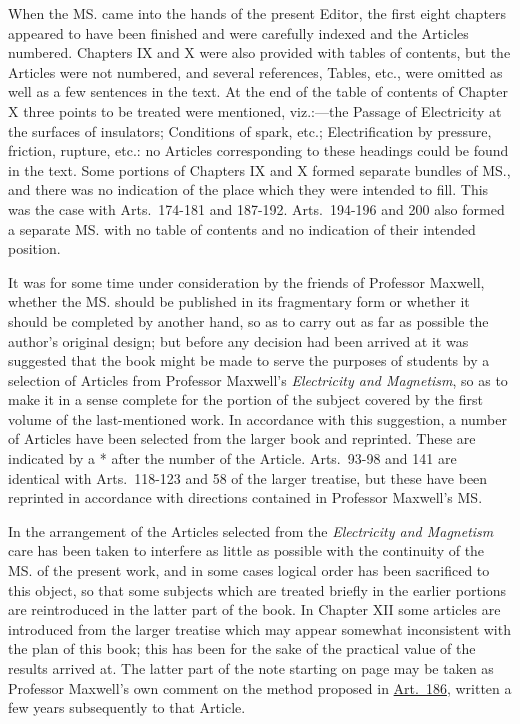 \documentclass[12pt,oneside]{book}[2021/10/04]
\newcommand{\¬}{\hphantom{0}}
\begin{document}
When the MS. came into the hands of the present Editor,
the first eight chapters appeared to have been finished and
were carefully indexed and the Articles numbered. Chapters
IX and X were also provided with tables of contents, but the
Articles were not numbered, and several references, Tables, etc.,
were omitted as well as a few sentences in the text. At the
end of the table of contents of Chapter X three points to be
treated were mentioned, viz.:---the Passage of Electricity at the
surfaces of insulators; Conditions of spark, etc.; Electrification
by pressure, friction, rupture, etc.: no Articles corresponding
to these headings could be found in the text. Some portions
of Chapters IX and X formed separate bundles of MS., and
there was no indication of the place which they were intended
to fill. This was the case with Arts.\ 174-181 and 187-192.
Arts.\ 194-196 and 200 also formed a separate MS. with no
table of contents and no indication of their intended position.

It was for some time under consideration by the friends of
Professor Maxwell, whether the MS. should be published in
its fragmentary form or whether it should be completed by
another hand, so as to carry out as far as possible the author's
original design; but before any decision had been arrived at
it was suggested that the book might be made to serve the
purposes of students by a selection of Articles from Professor
Maxwell's \textit{Electricity and Magnetism}, so as to make it in a
sense complete for the portion of the subject covered by the
first volume of the last-mentioned work. In accordance with
this suggestion, a number of Articles have been selected from
the larger book and reprinted. These are indicated by a *
after the number of the Article. Arts.\ 93-98 and 141 are
identical with Arts.\ 118-123 and 58 of the larger treatise, but
these have been reprinted in accordance with directions contained
in Professor Maxwell's MS.

In the arrangement of the Articles selected from the \textit{Electricity
and Magnetism} care has been taken to interfere as
little as possible with the continuity of the MS. of the present
work, and in some cases logical order has been sacrificed to
this object, so that some subjects which are treated briefly in
the earlier portions are reintroduced in the latter part of the
book. In Chapter XII some articles are introduced from the
larger treatise which may appear somewhat inconsistent with
the plan of this book; this has been for the sake of the practical
value of the results arrived at. The latter part of the
note starting on page \pageref{note:192} may be taken as Professor Maxwell's
own comment on the method proposed in \hyperref[art:186]{Art.\ 186}, written a few
years subsequently to that Article.
\end{document}
